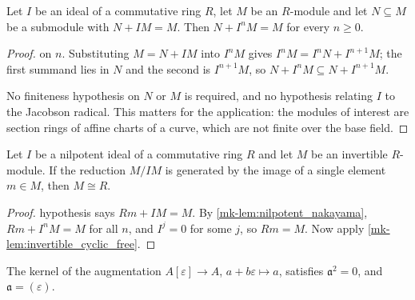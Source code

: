 \begin{lemma}\label{mk-lem:nilpotent_nakayama}
  \leanok

  Let \(I\) be an ideal of a commutative ring \(R\), let \(M\) be an
  \(R\)-module and let \(N \subseteq M\) be a submodule with
  \(N + IM = M\). Then \(N + I^{n}M = M\) for every \(n \ge 0\).
\end{lemma}

\begin{proof}
  \leanokInduction on \(n\). Substituting \(M = N + IM\) into \(I^{n}M\) gives
  \(I^{n}M = I^{n}N + I^{n+1}M\); the first summand lies in \(N\) and the
  second is \(I^{n+1}M\), so \(N + I^{n}M \subseteq N + I^{n+1}M\).

  No finiteness hypothesis on \(N\) or \(M\) is required, and no hypothesis
  relating \(I\) to the Jacobson radical. This matters for the application:
  the modules of interest are section rings of affine charts of a curve, which
  are not finite over the base field.
\end{proof}

\begin{proposition}\label{mk-prp:invertible_free_of_nilpotent}
  \leanok

  Let \(I\) be a nilpotent ideal of a commutative ring \(R\) and let \(M\) be
  an invertible \(R\)-module. If the reduction \(M/IM\) is generated by the
  image of a single element \(m \in M\), then \(M \cong R\).
\end{proposition}

\begin{proof}
  \leanokThe hypothesis says \(Rm + IM = M\). By
  \ref{mk-lem:nilpotent_nakayama}, \(Rm + I^{n}M = M\) for all \(n\), and
  \(I^{j} = 0\) for some \(j\), so \(Rm = M\). Now apply
  \ref{mk-lem:invertible_cyclic_free}.
\end{proof}

\begin{lemma}\label{mk-lem:dual_number_aug_square_zero}
  \leanok

  The kernel of the augmentation \(A[\varepsilon] \to A\),
  \(a + b\varepsilon \mapsto a\), satisfies \(\mathfrak{a}^{2} = 0\), and
  \(\mathfrak{a} = (\varepsilon)\).
\end{lemma}

